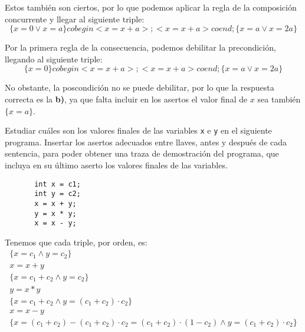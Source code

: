 \begin{ejercicio}
    Estos también son ciertos, por lo que podemos aplicar la regla de la composición concurrente y llegar al siguiente triple:
    \begin{equation*}
        \{x=0 \lor x=a\} cobegin <x=x+a>; <x=x+a> coend; \{x=a\lor x=2a\}
    \end{equation*}

    Por la primera regla de la consecuencia, podemos debilitar la precondición, llegando al siguiente triple:
    \begin{equation*}
        \{x=0\} cobegin <x=x+a>; <x=x+a> coend; \{x=a\lor x=2a\}
    \end{equation*}
    
    No obstante, la poscondición no se puede debilitar, por lo que la respuesta correcta es la \textbf{b)}, ya que falta incluir en los asertos el valor final de $x$ sea también $\{x=a\}$.

\end{ejercicio}

\begin{ejercicio}
   Estudiar cuáles son los valores finales de las variables \verb|x| e \verb|y| en el siguiente programa. Insertar los asertos adecuados entre llaves, antes y después de cada sentencia, para poder obtener una traza de demostración del programa, que incluya en su último aserto los valores finales de las variables. 
   \begin{verbatim}
       int x = c1;
       int y = c2;
       x = x + y;
       y = x * y;
       x = x - y;
   \end{verbatim}

   Tenemos que cada triple, por orden, es:
   \begin{gather*}
       \{x = c_1 \land y = c_2\}\\
       x = x + y \\
       \{x = c_1 + c_2 \land y =c_2\} \\
       y = x * y \\
       \{x = c_1 + c_2 \land y = (c_1 + c_2)\cdot c_2 \} \\
       x = x - y \\
       \{x = (c_1 + c_2) - (c_1 + c_2)\cdot c_2 = (c_1 + c_2)\cdot (1-c_2) \land y = (c_1 + c_2)\cdot c_2 \}
   \end{gather*}
\end{ejercicio}

